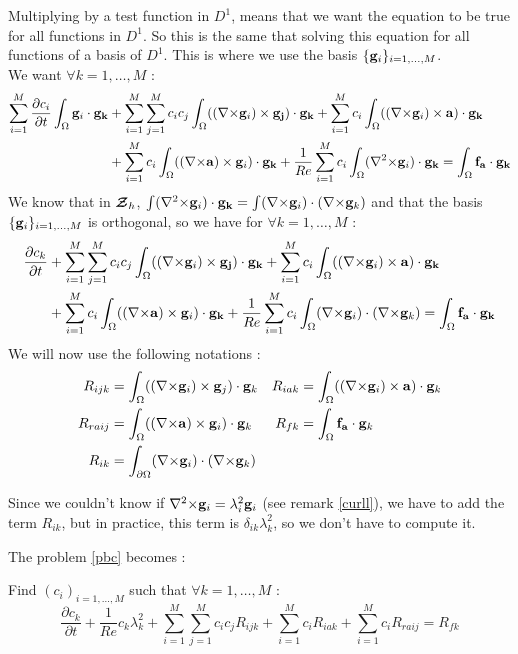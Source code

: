 Multiplying by a test function in $D^1$, means that we want the equation to be true for all functions in $D^1$. So this is the same that solving this equation for all functions of a basis of $D^1$. This is where we use the basis $\{{\mathbf{g}}_i\}_{i=1,\dots,M}$.\\
We want $\forall k=1,\dots,M$ :
\begin{align*}
\sum_{i=1}^M\frac{\partial c_i}{\partial t}\int_\Omega\mathbf{g}_i\cdot\mathbf{g_k} &+ \sum_{i=1}^M\sum_{j=1}^Mc_ic_j\int_\Omega(({\nabla\times}\mathbf{g}_i)\times \mathbf{g_j})\cdot\mathbf{g_k} + \sum_{i=1}^Mc_i\int_\Omega(({\nabla\times}\mathbf{g}_i)\times \mathbf{a})\cdot\mathbf{g_k}\\
& +  \sum_{i=1}^Mc_i\int_\Omega(({\nabla\times}\mathbf{a})\times \mathbf{g}_i)\cdot\mathbf{g_k} +\frac{1}{Re}\sum_{i=1}^Mc_i\int_\Omega({\nabla^2\times}\mathbf{g}_i)\cdot\mathbf{g_k} = \int_\Omega\mathbf{f_a}\cdot\mathbf{g_k}\\
\end{align*}
We know that in ${\bm{\mathcal{Z}}}_h$, $\int({\nabla^2\times}{\mathbf{g}}_i)\cdot{\mathbf{g_k}}=\int({\nabla\times}{\mathbf{g}}_i)\cdot({\nabla\times}{\mathbf{g}}_k)$ and that the basis $\{{\mathbf{g}}_i\}_{i=1,\dots,M}$ is orthogonal, so we have for $\forall k=1,\dots,M$ :
\begin{align*}
  \frac{\partial c_k}{\partial t} &+ \sum_{i=1}^M\sum_{j=1}^Mc_ic_j\int_\Omega(({\nabla\times}\mathbf{g}_i)\times \mathbf{g_j})\cdot\mathbf{g_k} + \sum_{i=1}^Mc_i\int_\Omega(({\nabla\times}\mathbf{g}_i)\times \mathbf{a})\cdot\mathbf{g_k}\\
  &+  \sum_{i=1}^Mc_i\int_\Omega(({\nabla\times}\mathbf{a})\times \mathbf{g}_i)\cdot\mathbf{g_k} + \frac{1}{Re}\sum_{i=1}^M c_i\int_\Omega({\nabla\times}{\mathbf{g}}_i)\cdot({\nabla\times}{\mathbf{g}}_k) = \int_\Omega\mathbf{f_a}\cdot\mathbf{g_k}
\end{align*}
We will now use the following notations :
\begin{align*}
  R_{ijk} &= \int_\Omega(({\nabla\times}\mathbf{g}_i)\times \mathbf{g}_j)\cdot\mathbf{g}_k & R_{iak} &= \int_\Omega(({\nabla\times}\mathbf{g}_i)\times \mathbf{a})\cdot\mathbf{g}_k\\
  R_{raij} &= \int_\Omega(({\nabla\times}\mathbf{a})\times \mathbf{g}_i)\cdot\mathbf{g}_k & R_{fk} &= \int_\Omega\mathbf{f_a}\cdot\mathbf{g}_k\\
  R_{ik} &= \int_{\partial\Omega} ({\nabla\times}{\mathbf{g}}_i)\cdot({\nabla\times}{\mathbf{g}}_k)
\end{align*}
\begin{rk}
  Since we couldn't know if ${\nabla^2\times}{\mathbf{g}}_i=\lambda^2_i {\mathbf{g}}_i$ (see remark \ref{curll}), we have to add the term $R_{ik}$, but in practice, this term is $\delta_{ik}\lambda^2_k$, so we don't have to compute it.
\end{rk}
The problem \ref{pbc} becomes :
\begin{pb}\label{fvc}
Find $(c_i)_{i=1,\dots,M}$ such that $\forall k=1,\dots,M$ :
\begin{equation*}
\frac{\partial c_k}{\partial t} + \frac{1}{Re}c_k\lambda_k^2 + \sum_{i=1}^M\sum_{j=1}^Mc_ic_jR_{ijk} + \sum_{i=1}^Mc_iR_{iak} + \sum_{i=1}^Mc_iR_{raij} = R_{fk}
\end{equation*}\end{pb}

